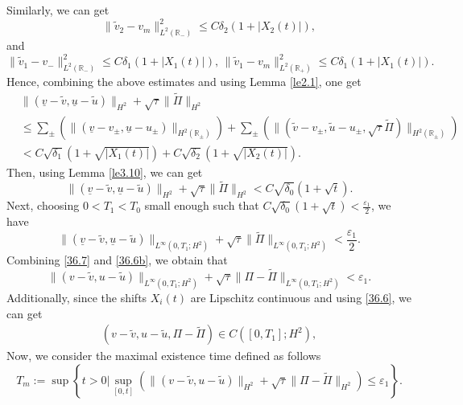 \documentclass[10pt,reqno]{amsart}
\numberwithin{equation}{section}
\begin{document}
Similarly, we can get
$$
\|\widetilde{v}_2-v_m\|_{L^2(\mathbb{R}_-)}^2\le C\delta_2(1+|X_2(t)|),
$$
and
$$
 \|\widetilde{v}_1-v_-\|_{L^2(\mathbb{R}_-)}^2\le C\delta_1(1+|X_1(t)|), \, \|\widetilde{v}_1-v_m\|_{L^2(\mathbb{R}_+)}^2\le C\delta_1(1+|X_1(t)|).
$$
Hence, combining the above estimates and using Lemma \ref{le2.1}, one get
\[
\begin{aligned}
&\|(\underline{v}-\widetilde{v},\underline{u}-\widetilde{u})\|_{H^2}
+\sqrt{\tau}\|\widetilde{\Pi}\|_{H^2}\\
&\le
\sum\limits_{\pm}\left(\|(\underline{v}-v_{\pm},\underline{u}-u_{\pm})\|_{H^2(\mathbb{R}_{\pm})}\right)
+\sum\limits_{\pm}\left(\|(\widetilde v-v_{\pm},\widetilde u-u_{\pm}, \sqrt{\tau}\widetilde \Pi)\|_{H^2(\mathbb{R}_{\pm})}\right)
\\
&<C\sqrt{\delta_1}(1+\sqrt{|X_1(t)|})+C\sqrt{\delta_2}(1+\sqrt{|X_2(t)|}).
\end{aligned}
\]
Then, using Lemma \ref{le3.10}, we can get
\begin{equation}\label{36.4}
\|(\underline{v}-\widetilde{v},\underline{u}-\widetilde{u})\|_{H^2}
+\sqrt{\tau}\|\widetilde{\Pi}\|_{H^2}<C\sqrt{\delta_0}(1+\sqrt{t}).
\end{equation}
Next, choosing $0<T_1<T_0$ small enough such that $C\sqrt{\delta_0}(1+\sqrt{t})<\frac{\varepsilon_1}{2}$, we have
\begin{equation}\label{36.6b}
\|(\underline{v}-\widetilde{v},\underline{u}-\widetilde{u})\|_{L^\infty(0, T_1; H^2)}
+\sqrt{\tau}\|\widetilde{\Pi}\|_{L^\infty(0, T_1; H^2)}<\frac{\varepsilon_1}{2}.
\end{equation}
Combining \eqref{36.7} and \eqref{36.6b}, we obtain that
\begin{equation}\label{36.6}
\|(v-\widetilde{v},u-\widetilde{u})\|_{L^\infty(0, T_1; H^2)}
+\sqrt{\tau}\|\Pi-\widetilde{\Pi}\|_{L^\infty(0, T_1; H^2)}<\varepsilon_1.
\end{equation}
Additionally, since the shifts $X_i(t)$ are Lipschitz continuous and using \eqref{36.6}, we can get
\begin{equation}\label{36.9}
\begin{aligned}
(v-\widetilde v, u-\widetilde u, \Pi-\widetilde \Pi)\in C([0,T_1];H^2),
\end{aligned}
\end{equation}
Now, we consider the maximal existence time defined as follows
\[
T_m:=\sup\left\{t>0\Big|\sup\limits_{[0, t]}\left(\|(v-\widetilde{v},u-\widetilde{u})\|_{H^2}
+\sqrt{\tau}\|\Pi-\widetilde{\Pi}\|_{H^2}\right)\le\varepsilon_1\right\}.
\]
\end{document}
